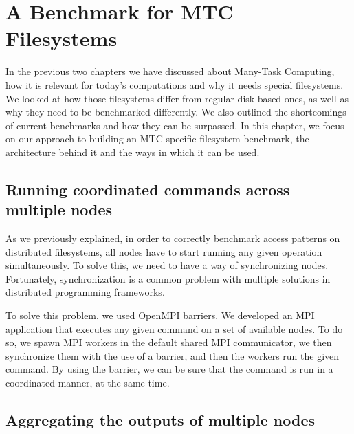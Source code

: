 
\chapter{A Benchmark for MTC Filesystems} %

\label{Chapter3} %


In the previous two chapters we have discussed about Many-Task Computing, how it is relevant for today's  computations and why it needs special filesystems. We looked at how those filesystems differ from regular disk-based ones, as well as why they need to be benchmarked differently. We also outlined the shortcomings of current benchmarks and how they can be surpassed. In this chapter, we focus on our approach to building an MTC-specific filesystem benchmark, the architecture behind it and the ways in which it can be used.

\section{Running coordinated commands across multiple nodes}

As we previously explained, in order to correctly benchmark access patterns on distributed filesystems, all nodes have to start running any given operation simultaneously. To solve this, we need to have a way of synchronizing nodes. Fortunately, synchronization is a common problem with multiple solutions in distributed programming frameworks.

To solve this problem, we used OpenMPI\cite{openmpi} barriers. We developed an MPI application that executes any given command on a set of available nodes. To do so, we spawn MPI workers in the default shared MPI communicator, we then synchronize them with the use of a barrier, and then the workers run the given command. By using the barrier, we can be sure that the command is run in a coordinated manner, at the same time.




\section{Aggregating the outputs of multiple nodes}



